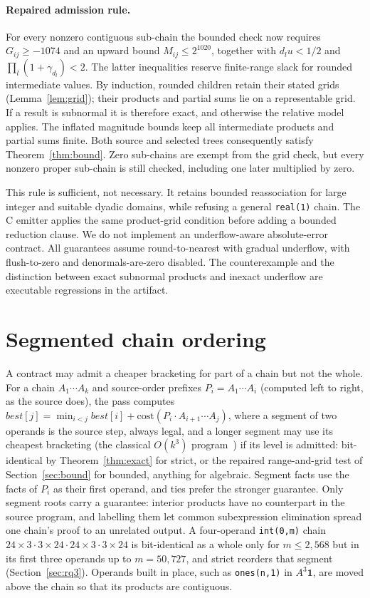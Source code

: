 \documentclass[acmsmall,review,anonymous,nonacm]{acmart}
\begin{document}
\paragraph{Repaired admission rule.}
For every nonzero contiguous sub-chain the bounded check now requires
$G_{ij}\ge-1074$ and an upward bound $M_{ij}\le2^{1020}$, together with
$d_lu<1/2$ and $\prod_l(1+\gamma_{d_l})<2$. The latter inequalities reserve
finite-range slack for rounded intermediate values. By induction, rounded
children retain their stated grids (Lemma~\ref{lem:grid}); their products and
partial sums lie on a representable grid. If a result is subnormal it is
therefore exact, and otherwise the relative model applies. The inflated
magnitude bounds keep all intermediate products and partial sums finite.
Both source and selected trees consequently satisfy Theorem~\ref{thm:bound}.
Zero sub-chains are exempt from the grid check, but every nonzero proper
sub-chain is still checked, including one later multiplied by zero.

This rule is sufficient, not necessary. It retains bounded reassociation for
large integer and suitable dyadic domains, while refusing a general
\texttt{real(1)} chain. The C emitter applies the same product-grid condition
before adding a bounded reduction clause. We do not implement an
underflow-aware absolute-error contract. All guarantees assume round-to-nearest
with gradual underflow, with flush-to-zero and denormals-are-zero disabled.
The counterexample and the distinction between exact subnormal products and
inexact underflow are executable regressions in the artifact.

\section{Segmented chain ordering}\label{sec:chain}
A contract may admit a cheaper bracketing for part of a chain but not the whole.
For a chain $A_1\cdots A_k$ and source-order prefixes $P_i=A_1\cdots A_i$
(computed left to right, as the source does), the pass computes
$\mathit{best}[j]=\min_{i<j}\mathit{best}[i]+\mathrm{cost}(P_i\cdot A_{i+1}\cdots A_j)$,
where a segment of two operands is the source step, always legal, and a longer
segment may use its cheapest bracketing (the classical $O(k^3)$
program~\cite{hu-shing}) if its level is admitted: bit-identical by
Theorem~\ref{thm:exact} for strict, or the repaired range-and-grid test
of Section~\ref{sec:bound} for bounded,
anything for algebraic. Segment facts use the facts of $P_i$ as their first
operand, and ties prefer the stronger guarantee. Only segment roots carry a
guarantee: interior products have no counterpart in the source program, and
labelling them let common subexpression elimination spread one chain's proof to
an unrelated output. A four-operand \texttt{int(0,m)} chain
$24\times3\cdot3\times24\cdot24\times3\cdot3\times24$ is bit-identical as a
whole only for $m\le2{,}568$ but in its first three operands up to $m=50{,}727$,
and strict reorders that segment (Section~\ref{sec:rq3}). Operands built in
place, such as \texttt{ones(n,1)} in $A^3\mathbf 1$, are moved above the chain
so that its products are contiguous.
\end{document}
